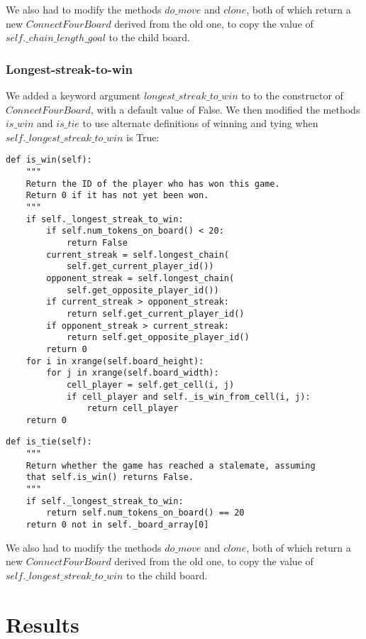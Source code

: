 \documentclass[11pt]{article}
\begin{document}
We also had to modify the methods \(do\_move\) and \(clone\), both of which
return a new \(ConnectFourBoard\) derived from the old one, to copy the value
of \(self.\_chain\_length\_goal\) to the child board.

\subsubsection{Longest-streak-to-win}

We added a keyword argument \(longest\_streak\_to\_win\) to to the
constructor of \(ConnectFourBoard\), with a default value of False. We then
modified the methods \(is\_win\) and \(is\_tie\) to use alternate definitions
of winning and tying when \(self.\_longest\_streak\_to\_win\) is True:

\lstset{language=Python}
\begin{lstlisting}[frame=single]
def is_win(self):
	"""
	Return the ID of the player who has won this game.
	Return 0 if it has not yet been won.
	"""
	if self._longest_streak_to_win:
		if self.num_tokens_on_board() < 20:
			return False
		current_streak = self.longest_chain(
			self.get_current_player_id())
		opponent_streak = self.longest_chain(
			self.get_opposite_player_id())
		if current_streak > opponent_streak:
			return self.get_current_player_id()
		if opponent_streak > current_streak:
			return self.get_opposite_player_id()
		return 0
	for i in xrange(self.board_height):
		for j in xrange(self.board_width):
			cell_player = self.get_cell(i, j)
			if cell_player and self._is_win_from_cell(i, j):
				return cell_player
	return 0
\end{lstlisting}

\lstset{language=Python}
\begin{lstlisting}[frame=single]
def is_tie(self):
	"""
	Return whether the game has reached a stalemate, assuming
	that self.is_win() returns False.
	"""
	if self._longest_streak_to_win:
		return self.num_tokens_on_board() == 20
	return 0 not in self._board_array[0]
\end{lstlisting}

We also had to modify the methods \(do\_move\) and \(clone\), both of which
return a new \(ConnectFourBoard\) derived from the old one, to copy the value
of \(self.\_longest\_streak\_to\_win\) to the child board.

\section{Results}
\end{document}
